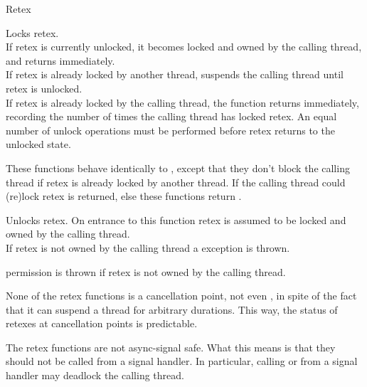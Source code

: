 \begin{classpage}{Retex}
\begin{mandescription}
  Locks  retex.\\
  If  retex is currently unlocked, it becomes locked and
  owned by the calling thread, and  returns
  immediately.\\
  If  retex is already locked by another thread,
   suspends the calling thread until  retex is
  unlocked.\\
  If  retex is already locked by the calling thread, the
  function returns immediately, recording the number of times the
  calling thread has locked  retex. An equal number of
  unlock operations must be performed before  retex returns
  to the unlocked state.

  These functions behave identically to , except
  that they don't block the calling thread if  retex is
  already locked by another thread. If the calling thread could 
  (re)lock  retex  is returned, else these
  functions return .

  Unlocks  retex. On entrance to this function 
  retex is assumed to be locked and owned by the calling
  thread.\\
  If  retex is  not owned by the calling thread a
   exception is thrown.
  \begin{exception}
    \item[permission] is thrown if 
      retex is not owned by the calling thread.
  \end{exception}
\end{mandescription}

  None of the retex functions is a cancellation point, not even
  , in spite of the fact that it can suspend a
  thread for arbitrary durations. This way, the status of retexes at
  cancellation points is predictable.

  The retex functions are not async-signal safe. What this means is
  that they should not be called from a signal handler. In particular,
  calling  or  from a signal
  handler may deadlock the calling thread.

\end{classpage}
